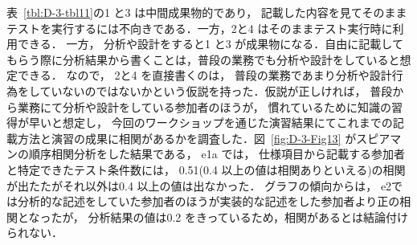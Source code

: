 \documentclass[a4paper,12pt]{jreport}
\begin{document}
表~\ref{tbl:D-3-tbl11}の1 と3 は中間成果物的であり， 記載した内容を見てそのままテストを実行するには不向きである．一方，2と4 はそのままテスト実行時に利用できる． 一方， 分析や設計をすると1 と3 が成果物になる．自由に記載してもらう際に分析結果から書くことは，普段の業務でも分析や設計をしていると想定できる． なので， 2と4 を直接書くのは， 普段の業務であまり分析や設計行為をしていないのではないかという仮説を持った．仮説が正しければ， 普段から業務にて分析や設計をしている参加者のほうが， 慣れているために知識の習得が早いと想定し， 今回のワークショップを通じた演習結果にてこれまでの記載方法と演習の成果に相関があるかを調査した．図~\ref{fig:D-3-Fig13} がスピアマンの順序相関分析をした結果である， e1a では， 仕様項目から記載する参加者と特定できたテスト条件数には， 0.51(0.4 以上の値は相関ありといえる)の相関が出たたがそれ以外は0.4 以上の値は出なかった． グラフの傾向からは， e2では分析的な記述をしていた参加者のほうが実装的な記述をした参加者より正の相関となったが， 分析結果の値は0.2 をきっているため，相関があるとは結論付けられない．
\end{document}
